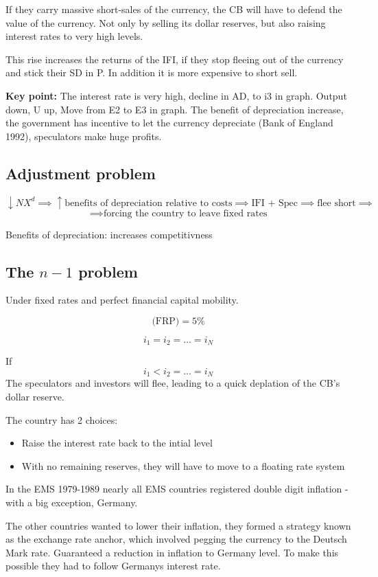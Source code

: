 \documentclass{report}
\begin{document}
If they carry massive short-sales of the currency, the CB will have to defend the value of the currency. Not only by selling its dollar reserves, but also raising interest rates to very high levels.

This rise increases the returns of the IFI, if they stop fleeing out of the currency and stick their SD in P. In addition it is more expensive to short sell.

\textbf{Key point:}
The interest rate is very high, decline in AD, to i3 in graph. Output down, U up, Move from E2 to E3 in graph. 
The benefit of depreciation increase, the government has incentive to let the currency depreciate (Bank of England 1992), speculators make huge profits. 

\subsection{Adjustment problem}

   $$\downarrow NX^d \implies \uparrow \text{benefits of depreciation relative to costs} \implies \text{IFI + Spec} \implies \text{flee short} \implies  $$
   $$\implies \text{forcing the country to leave fixed rates}$$


Benefits of depreciation: increases competitivness

\subsection{The $n - 1$ problem}

	Under fixed rates and perfect financial capital mobility.
	
	$$\text{(FRP)} = 5\%$$
	
	$$i_1 = i_2 = \ldots = i_N$$
	
	If $$i_1 < i_2 = \ldots = i_N$$
	The speculators and investors will flee, leading to a quick deplation of the CB’s dollar reserve.

The country has 2 choices:
\begin{itemize}
    \item 	Raise the interest rate back to the intial level
    \item	With no remaining reserves, they will have to move to a floating rate system 
\end{itemize}


In the EMS 1979-1989 nearly all EMS countries registered double digit inflation - with a big exception, Germany.

The other countries wanted to lower their inflation, they formed a strategy known as the exchange rate anchor, which involved pegging the currency to the Deutsch Mark rate. Guaranteed a reduction in  inflation to Germany level. To make this possible they had to follow Germanys interest rate.
\end{document}
